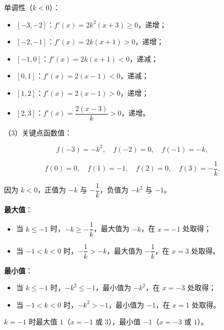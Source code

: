 \begin{answer}
单调性（$k<0$）：

\begin{itemize}
\item $[-3,-2]$：$f'(x)=2k^2(x+3)\geqslant0$，递增；
\item $[-2,-1]$：$f'(x)=2k(x+1)>0$，递增；
\item $[-1,0]$：$f'(x)=2k(x+1)<0$，递减；
\item $[0,1]$：$f'(x)=2(x-1)<0$，递减；
\item $[1,2]$：$f'(x)=2(x-1)>0$，递增；
\item $[2,3]$：$f'(x)=\dfrac{2(x-3)}k>0$，递增。
\end{itemize}

（3）关键点函数值：

\nopagebreak[4]
\[f(-3)=-k^2,\quad f(-2)=0,\quad f(-1)=-k,\]

\nopagebreak[4]
\[f(0)=0,\quad f(1)=-1,\quad f(2)=0,\quad f(3)=-\frac1k.\]

因为 $k<0$，正值为 $-k$ 与 $-\dfrac1k$，负值为 $-k^2$ 与 $-1$。

\textbf{最大值}：

\begin{itemize}
\item 当 $k\leqslant-1$ 时，$-k\geqslant-\dfrac1k$，最大值为 $-k$，在 $x=-1$ 处取得；
\item 当 $-1<k<0$ 时，$-\dfrac1k>-k$，最大值为 $-\dfrac1k$，在 $x=3$ 处取得。
\end{itemize}

\textbf{最小值}：

\begin{itemize}
\item 当 $k\leqslant-1$ 时，$-k^2\leqslant-1$，最小值为 $-k^2$，在 $x=-3$ 处取得；
\item 当 $-1<k<0$ 时，$-k^2>-1$，最小值为 $-1$，在 $x=1$ 处取得。
\end{itemize}

$k=-1$ 时最大值 $1$（$x=-1$ 或 $3$），最小值 $-1$（$x=-3$ 或 $1$）。


\end{answer}
